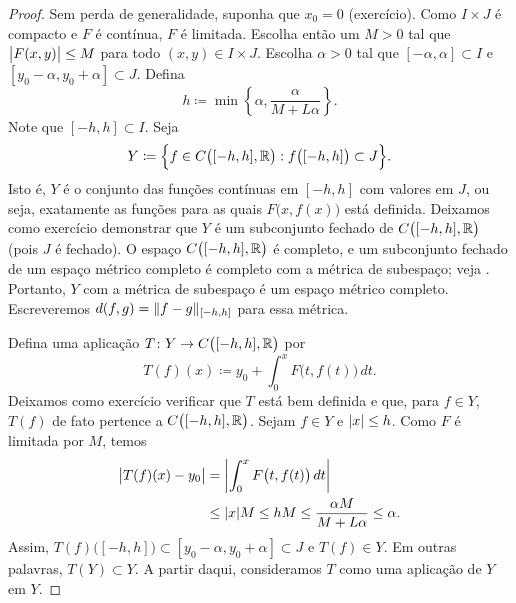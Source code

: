 \begin{proof}
Sem perda de generalidade, suponha que $x_0 =0$ (exercício).
Como $I \times J$ é compacto e
$F$ é contínua, $F$ é limitada.
Escolha então um $M > 0$ tal que
$\bigl\lvert {F(x,y)} \bigr\rvert \leq M$ para todo $(x,y) \in I\times J$.
Escolha $\alpha > 0$ tal que
$[-\alpha,\alpha] \subset I$ e $[y_0-\alpha, y_0 + \alpha] \subset J$.
Defina
\begin{equation*}
h \coloneqq \min \left\{ \alpha, \frac{\alpha}{M+L\alpha} \right\} .
\end{equation*}
Note que $[-h,h] \subset I$. Seja
\begin{equation*}
Y \coloneqq \Bigl\{ f \in C\bigl([-h,h],{\mathbb{R}}\bigr) : f\bigl([-h,h]\bigr) \subset J \Bigr\} .
\end{equation*}
Isto é, $Y$ é o conjunto das funções contínuas em $[-h,h]$ com valores em
$J$, ou seja,
exatamente as funções para as quais $F\bigl(x,f(x)\bigr)$ está definida.
Deixamos como exercício demonstrar que $Y$ é um subconjunto fechado de $C\bigl([-h,h],{\mathbb{R}}\bigr)$
(pois $J$ é fechado).
O espaço $C\bigl([-h,h],{\mathbb{R}}\bigr)$ é completo, e
um subconjunto fechado de um espaço métrico completo é completo com
a métrica de subespaço; veja . Portanto, $Y$ com a
métrica de subespaço é um espaço métrico completo.
Escreveremos $d(f,g) = \lVert {f-g} \rVert_{[-h,h]}$ para essa métrica.

Defina uma aplicação
$T \colon Y \to C\bigl([-h,h],{\mathbb{R}}\bigr)$ por
\begin{equation*}
T(f)(x)
\coloneqq
y_0 + \int_0^x F\bigl(t,f(t)\bigr)\,dt .
\end{equation*}
Deixamos como exercício verificar que
$T$ está bem definida e que, para $f \in Y$, $T(f)$ de fato pertence a $C\bigl([-h,h],{\mathbb{R}}\bigr)$.
Sejam $f \in Y$ e $\lvert {x} \rvert \leq h$.
Como $F$ é limitada por $M$, temos
\begin{equation*}
\begin{split}
\bigl\lvert {T(f)(x) - y_0} \bigr\rvert
&= \left\lvert {\int_0^x F\bigl(t,f(t)\bigr)\,dt} \right\rvert \\
& \leq 
\lvert {x} \rvert M \leq hM \leq \frac{\alpha M}{M+ L\alpha} \leq \alpha .
\end{split}
\end{equation*}
Assim, $T(f)\bigl([-h,h]\bigr) \subset [y_0-\alpha,y_0+\alpha] \subset J$ e
$T(f) \in Y$. Em outras palavras, $T(Y) \subset Y$. A partir daqui,
consideramos $T$ como uma aplicação de $Y$ em $Y$.


\end{proof}
